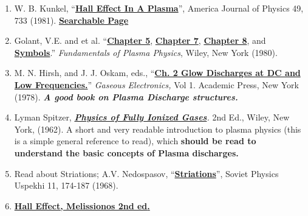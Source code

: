 \documentclass{../lab}
\begin{document}
\begin{enumerate}
    \item W. B. Kunkel, ``\href{http://physics111.lib.berkeley.edu/Physics111/Reprints/HAL/Kunkel_HAL.pdf}{\textbf{Hall Effect In A Plasma}}'', America Journal of Physics 49, 733 (1981). \href{http://physics111.lib.berkeley.edu/Physics111/Reprints/HAL/Kunkel\_HAL.pdf}{\textbf{Searchable Page}}

    \item Golant, V.E. and et al. ``\href{http://physics111.lib.berkeley.edu/Physics111/Reprints/HAL/V.\%20E.\%20GOLANT/Ch.\%205\_Distribution\%20function\%20of\%20charged\%20particles\%20in\%20electric\%20field\%20pg.\%20108-154.pdf}{\textbf{Chapter 5}}, \href{http://physics111.lib.berkeley.edu/Physics111/Reprints/HAL/V.\%20E.\%20GOLANT/Ch.7\_Transport\%20processes\%20in\%20plasma\%20without\%20magnetic\%20field\%20pg\%20181-240.pdf}{\textbf{Chapter 7}}, \href{http://physics111.lib.berkeley.edu/Physics111/Reprints/HAL/V.\%20E.\%20GOLANT/Ch.\%208\_Motion\%20of\%20charged\%20plasma\%20particles\%20in\%20magnetic\%20field\%20pg\%20241-279.pdf}{\textbf{Chapter 8}}, and \href{http://physics111.lib.berkeley.edu/Physics111/Reprints/HAL/V.\%20E.\%20GOLANT/Symbols\_pg\%20xi-xvi.pdf}{\textbf{Symbols}}.'' \emph{Fundamentals of Plasma Physics}, Wiley, New York (1980).

    \item M. N. Hirsh, and J. J. Oskam, eds., ``\href{http://physics111.lib.berkeley.edu/Physics111/Reprints/HAL/Gaseous\%20Electronics\_HirshnOskam\%20ch2.pdf}{\textbf{\textbf{Ch. 2 Glow Discharges at DC and Low Frequencies}.}}'' \emph{Gaseous Electronics,} Vol 1. Academic Press, New York (1978). \emph{\textbf{A good book on Plasma Discharge structures.}}

    \item Lyman Spitzer, \emph{\href{http://physics111.lib.berkeley.edu/Physics111/Reprints/HAL/SPITZER/Physics\%20of\%20Fully\%20Ionized\%20Gases.pdf}{\textbf{Physics of Fully Ionized Gases}}.} 2nd Ed., Wiley, New York, (1962). A short and very readable introduction to plasma physics (this is a simple general reference to read), which \textbf{should be read to understand the basic concepts of Plasma discharges.}

    \item Read about Striations; A.V. Nedospasov, ``\href{http://physics111.lib.berkeley.edu/Physics111/Reprints/HAL/04-Striations.pdf}{\textbf{Striations}}'', Soviet Physics Uspekhi 11, 174-187 (1968).

    \item \href{http://physics111.lib.berkeley.edu/Physics111/Reprints/HAL/The\%20Hall\%20Effect\_Melissinos-2nd-Ed.pdf}{\textbf{\textbf{Hall Effect, Melissionos 2nd ed}.}} 

\end{enumerate}
\end{document}
